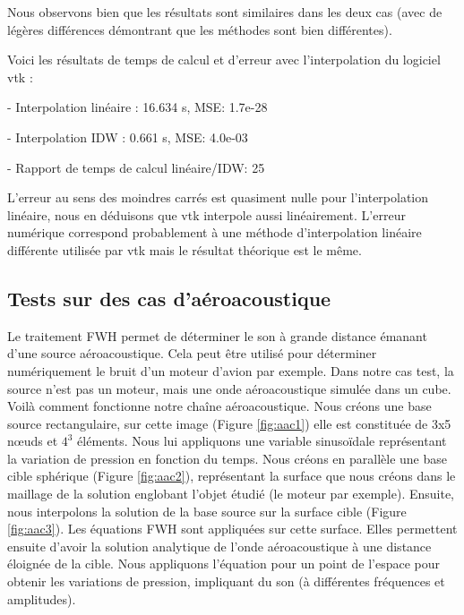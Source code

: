 Nous observons bien que les résultats sont similaires dans les deux cas (avec de légères différences démontrant que les méthodes sont bien différentes).

Voici les résultats de temps de calcul et d'erreur avec l'interpolation du logiciel vtk :

- Interpolation linéaire :         16.634 s, MSE: 1.7e-28

\vspace{-0,2cm}

- Interpolation IDW :\hspace{0,4cm} 0.661 s, MSE: 4.0e-03

\vspace{-0,2cm}

- Rapport de temps de calcul linéaire/IDW: 25

L'erreur au sens des moindres carrés est quasiment nulle pour l'interpolation linéaire, nous en déduisons que vtk interpole aussi linéairement. L'erreur numérique correspond probablement à une méthode d'interpolation linéaire différente utilisée par vtk mais le résultat théorique est le même.

\subsection{Tests sur des cas d'aéroacoustique}\label{s241}

Le traitement FWH permet de déterminer le son à grande distance émanant d'une source aéroacoustique. Cela peut être utilisé pour déterminer numériquement le bruit d'un moteur d'avion par exemple.
Dans notre cas test, la source n'est pas un moteur, mais une onde aéroacoustique simulée dans un cube.
Voilà comment fonctionne notre chaîne aéroacoustique.\label{s243}
Nous créons une base source rectangulaire, sur cette image (Figure \ref{fig:aac1}) elle est constituée de 3x5 nœuds et $4^3$ éléments.
Nous lui appliquons une variable sinusoïdale représentant la variation de pression en fonction du temps.
Nous créons en parallèle une base cible sphérique (Figure \ref{fig:aac2}), représentant la surface que nous créons dans le maillage de la solution englobant l'objet étudié (le moteur par exemple).
Ensuite, nous interpolons la solution de la base source sur la surface cible (Figure \ref{fig:aac3}).
Les équations FWH sont appliquées sur cette surface. Elles permettent ensuite d'avoir la solution analytique de l'onde aéroacoustique à une distance éloignée de la cible. Nous appliquons l'équation pour un point de l'espace pour obtenir les variations de pression, impliquant du son (à différentes fréquences et amplitudes).


